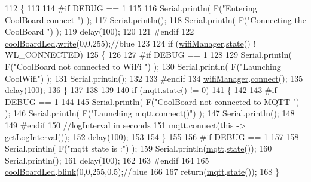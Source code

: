 \begin{DoxyCode}
112 \{
113 
114 \textcolor{preprocessor}{#if DEBUG == 1  }
115 
116     Serial.println( F(\textcolor{stringliteral}{"Entering CoolBoard.connect "}) );
117     Serial.println();
118     Serial.println( F(\textcolor{stringliteral}{"Connecting the CoolBoard  "}) );
119     delay(100);
120 
121 \textcolor{preprocessor}{#endif}
122     \hyperlink{classCoolBoard_a1b1d3c684a5baa56b08486e192fd8e97}{coolBoardLed}.\hyperlink{classCoolBoardLed_a30fadd4cbec17ceea428bf7a32207e87}{write}(0,0,255);\textcolor{comment}{//blue}
123 
124     \textcolor{keywordflow}{if} (\hyperlink{classCoolBoard_acd88e6003606b47479ebba81e4aceeca}{wifiManager}.\hyperlink{classCoolWifi_a1c7b4d82a4098d346e7593dce92039fa}{state}() != WL\_CONNECTED)
125     \{       
126     
127 \textcolor{preprocessor}{    #if DEBUG == 1      }
128 
129         Serial.println( F(\textcolor{stringliteral}{"CoolBoard not connected to WiFi "}) );
130         Serial.println( F(\textcolor{stringliteral}{"Launching CoolWifi"}) );
131         Serial.println();
132 
133 \textcolor{preprocessor}{    #endif}
134         \hyperlink{classCoolBoard_acd88e6003606b47479ebba81e4aceeca}{wifiManager}.\hyperlink{classCoolWifi_ad060353050f40d032a2dbf9e54a768bf}{connect}();
135         delay(100);
136     \}
137 
138 
139     
140     \textcolor{keywordflow}{if} (\hyperlink{classCoolBoard_a2399f44d7c23c1149a335cb3b46d90f1}{mqtt}.\hyperlink{classCoolMQTT_a5d003307eff78efbd585e42b43b72b6d}{state}() != 0)
141     \{   
142     
143 \textcolor{preprocessor}{    #if DEBUG == 1  }
144     
145         Serial.println( F(\textcolor{stringliteral}{"CoolBoard not connected to MQTT "}) );
146         Serial.println( F(\textcolor{stringliteral}{"Launching mqtt.connect()"}) );
147         Serial.println();
148 
149 \textcolor{preprocessor}{    #endif  }
150         \textcolor{comment}{//logInterval in seconds}
151         \hyperlink{classCoolBoard_a2399f44d7c23c1149a335cb3b46d90f1}{mqtt}.\hyperlink{classCoolMQTT_a50075d0ab23a327ab897fd6adad20eda}{connect}(\textcolor{keyword}{this} -> \hyperlink{classCoolBoard_a7508e029f2ee17bb747ffab599285e0d}{getLogInterval}());
152         delay(100);
153         
154     \}
155     
156 \textcolor{preprocessor}{#if DEBUG == 1}
157 
158     Serial.println( F(\textcolor{stringliteral}{"mqtt state is :"}) );
159     Serial.println(\hyperlink{classCoolBoard_a2399f44d7c23c1149a335cb3b46d90f1}{mqtt}.\hyperlink{classCoolMQTT_a5d003307eff78efbd585e42b43b72b6d}{state}());
160     Serial.println();
161     delay(100);
162 
163 \textcolor{preprocessor}{#endif}
164 
165     \hyperlink{classCoolBoard_a1b1d3c684a5baa56b08486e192fd8e97}{coolBoardLed}.\hyperlink{classCoolBoardLed_a96e1ea13003eee34c9dbcef340404426}{blink}(0,0,255,0.5);\textcolor{comment}{//blue}
166 
167     \textcolor{keywordflow}{return}(\hyperlink{classCoolBoard_a2399f44d7c23c1149a335cb3b46d90f1}{mqtt}.\hyperlink{classCoolMQTT_a5d003307eff78efbd585e42b43b72b6d}{state}());
168 \}
\end{DoxyCode}
